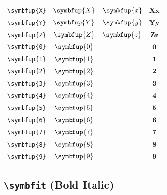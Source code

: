 \documentclass[12pt,a4paper]{article}
\begin{document}
\begin{longtable}{|c|c|c|c|}
\verb|\symbfup{X}| & $\symbfup{X}$ & $\symbfup{x}$ & $ 𝐗 𝐱 $ \\
\verb|\symbfup{Y}| & $\symbfup{Y}$ & $\symbfup{y}$ & $ 𝐘 𝐲 $ \\
\verb|\symbfup{Z}| & $\symbfup{Z}$ & $\symbfup{z}$ & $ 𝐙 𝐳 $ \\
\verb|\symbfup{0}| & $\symbfup{0}$ & & $ 𝟎 $ \\
\verb|\symbfup{1}| & $\symbfup{1}$ & & $ 𝟏 $ \\
\verb|\symbfup{2}| & $\symbfup{2}$ & & $ 𝟐 $ \\
\verb|\symbfup{3}| & $\symbfup{3}$ & & $ 𝟑 $ \\
\verb|\symbfup{4}| & $\symbfup{4}$ & & $ 𝟒 $ \\
\verb|\symbfup{5}| & $\symbfup{5}$ & & $ 𝟓 $ \\
\verb|\symbfup{6}| & $\symbfup{6}$ & & $ 𝟔 $ \\
\verb|\symbfup{7}| & $\symbfup{7}$ & & $ 𝟕 $ \\
\verb|\symbfup{8}| & $\symbfup{8}$ & & $ 𝟖 $ \\
\verb|\symbfup{9}| & $\symbfup{9}$ & & $ 𝟗 $ \\
\hline
\end{longtable}

\newpage

\subsection*{\texttt{\textbackslash{}symbfit} (Bold Italic)}
\end{document}
